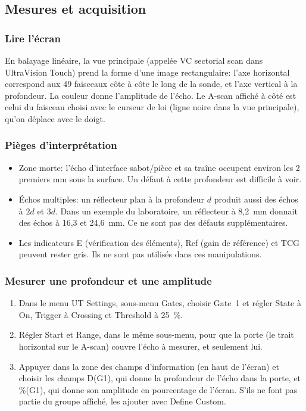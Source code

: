 \documentclass[11pt,letterpaper]{article}
\begin{document}
\subsection{Mesures et acquisition}
\label{sec:mesure}

\subsubsection*{Lire l'\'ecran}

En balayage lin\'eaire, la vue principale (appel\'ee VC sectorial scan dans UltraVision Touch) prend la forme d'une image rectangulaire: l'axe horizontal correspond aux 49 faisceaux c\^ote \`a c\^ote le long de la sonde, et l'axe vertical \`a la profondeur. La couleur donne l'amplitude de l'\'echo. Le A-scan affich\'e \`a c\^ot\'e est celui du faisceau choisi avec le curseur de loi (ligne noire dans la vue principale), qu'on d\'eplace avec le doigt.

\subsubsection*{Pi\`eges d'interpr\'etation}

\begin{itemize}
  \item Zone morte: l'\'echo d'interface sabot/pi\`ece et sa tra\^ine occupent environ les 2 premiers mm sous la surface. Un d\'efaut \`a cette profondeur est difficile \`a voir.
  \item \'Echos multiples: un r\'eflecteur plan \`a la profondeur $d$ produit aussi des \'echos \`a $2d$ et $3d$. Dans un exemple du laboratoire, un r\'eflecteur \`a 8,2~mm donnait des \'echos \`a 16,3 et 24,6~mm. Ce ne sont pas des d\'efauts suppl\'ementaires.
  \item Les indicateurs E (v\'erification des \'el\'ements), Ref (gain de r\'ef\'erence) et TCG peuvent rester gris. Ils ne sont pas utilis\'es dans ces manipulations.
\end{itemize}

\subsubsection*{Mesurer une profondeur et une amplitude}

\begin{enumerate}
  \item Dans le menu UT Settings, sous-menu Gates, choisir Gate~1 et r\'egler State \`a On, Trigger \`a Crossing et Threshold \`a 25~\%.
  \item R\'egler Start et Range, dans le m\^eme sous-menu, pour que la porte (le trait horizontal sur le A-scan) couvre l'\'echo \`a mesurer, et seulement lui.
  \item Appuyer dans la zone des champs d'information (en haut de l'\'ecran) et choisir les champs D(G1), qui donne la profondeur de l'\'echo dans la porte, et \%(G1), qui donne son amplitude en pourcentage de l'\'ecran. S'ils ne font pas partie du groupe affich\'e, les ajouter avec Define Custom.
\end{enumerate}
\end{document}
